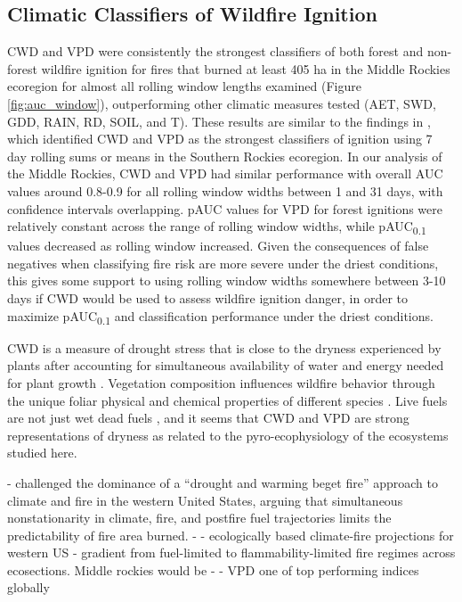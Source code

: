 \documentclass[11pt]{article}
\newcommand{\pauc}[1]{pAUC\textsubscript{#1}}
\begin{document}
\subsection{Climatic Classifiers of Wildfire Ignition}
CWD and VPD were consistently the strongest classifiers of both forest and non-forest wildfire ignition for fires that burned at least 405 ha in the Middle Rockies ecoregion for almost all rolling window lengths examined (Figure \ref{fig:auc_window}), outperforming other climatic measures tested (AET, SWD, GDD, RAIN, RD, SOIL, and T).  These results are similar to the findings in , which identified CWD and VPD as the strongest classifiers of ignition using 7 day rolling sums or means in the Southern Rockies ecoregion.  In our analysis of the Middle Rockies, CWD and VPD had similar performance with overall AUC values around 0.8-0.9 for all rolling window widths between 1 and 31 days, with confidence intervals overlapping.  pAUC values for VPD for forest ignitions were relatively constant across the range of rolling window widths, while \pauc{0.1} values decreased as rolling window increased.  Given the consequences of false negatives when classifying fire risk are more severe under the driest conditions, this gives some support to using rolling window widths somewhere between 3-10 days if CWD would be used to assess wildfire ignition danger, in order to maximize \pauc{0.1} and classification performance under the driest conditions.

CWD is a measure of drought stress that is close to the dryness experienced by plants after accounting for simultaneous availability of water and energy needed for plant growth \citep{stephensonActualEvapotranspirationDeficit1998}. Vegetation composition influences wildfire behavior through the unique foliar physical and chemical properties of different species \citep{mattjollySeasonalVariationsRed2016}. Live fuels are not just wet dead fuels \citep{jollyPyroEcophysiologyShiftingParadigm2018}, and it seems that CWD and VPD are strong representations of dryness as related to the pyro-ecophysiology of the ecosystems studied here.

- \citet{littellClimateChangeFuture2018} challenged the dominance of a “drought and warming beget fire” approach to climate and fire in the western United States, arguing that simultaneous nonstationarity in climate, fire, and postfire fuel trajectories limits the predictability of fire area burned.
- \citet{littellClimateChangeFuture2018} - ecologically based climate-fire projections for western US - gradient from fuel-limited to flammability-limited fire regimes across ecosections.  Middle rockies would be
- \citet{zacharakisEnvironmentalForestFire2023} - VPD one of top performing indices globally
\end{document}
